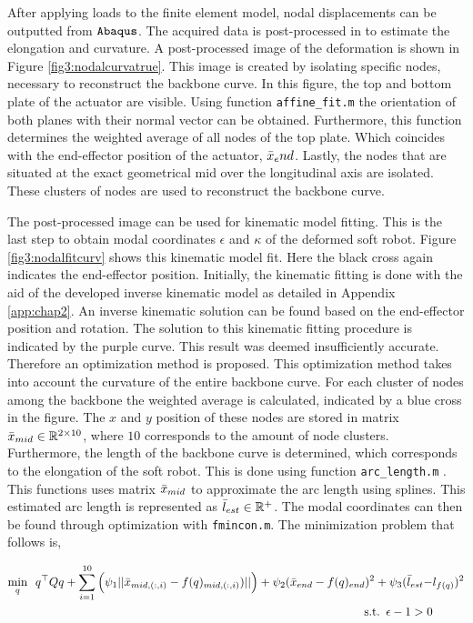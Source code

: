 After applying loads to the finite element model, nodal displacements can be outputted from $\verb+Abaqus+$. The acquired data is post-processed in \MATLAB to estimate the elongation and curvature. A post-processed image of the deformation is shown in Figure \ref{fig3:nodalcurvatrue}. This image is created by isolating specific nodes, necessary to reconstruct the backbone curve. In this figure, the top and bottom plate of the actuator are visible. Using \MATLAB function \verb+affine_fit.m+ \cite{affinefit} the orientation of both planes with their normal vector can be obtained. Furthermore, this function determines the weighted average of all nodes of the top plate. Which coincides with the end-effector position of the actuator, $\Bar{x}_end$. Lastly, the nodes that are situated at the exact geometrical mid over the longitudinal axis are isolated. These clusters of nodes are used to reconstruct the backbone curve. 


The post-processed image can be used for kinematic model fitting. This is the last step to obtain modal coordinates $\epsilon$ and $\kappa$ of the deformed soft robot. Figure \ref{fig3:nodalfitcurv} shows this kinematic model fit. Here the black cross again indicates the end-effector position. Initially, the kinematic fitting is done with the aid of the developed inverse kinematic model as detailed in Appendix \ref{app:chap2}. An inverse kinematic solution can be found based on the end-effector position and rotation. The solution to this kinematic fitting procedure is indicated by the purple curve. This result was deemed insufficiently accurate. Therefore an optimization method is proposed. This optimization method takes into account the curvature of the entire backbone curve. For each cluster of nodes among the backbone the weighted average is calculated, indicated by a blue cross in the figure. The $x$ and $y$ position of these nodes are stored in matrix $\Bar{x}_{mid} \in \mathbb{R}^{2\times 10}$, where $10$ corresponds to the amount of node clusters. Furthermore, the length of the backbone curve is determined, which corresponds to the elongation of the soft robot. This is done using \MATLAB function \verb+arc_length.m+ \cite{arclength}. This functions uses matrix $\Bar{x}_{mid}$ to approximate the arc length using splines. This estimated arc length is represented as $\Bar{l}_{est} \in \mathbb{R}^+$. The modal coordinates can then be found through optimization with \verb+fmincon.m+. The minimization problem that follows is,


\begin{equation}
\begin{aligned}
\min_{q} \hspace{5pt}  q^\top Q q  + \sum_{i=1}^{10}\Big(\psi_1 ||\Bar{x}_{mid,(:,i)} - f(q)_{mid,(:,i)})|| \Big) +   \psi_2(\Bar{x}_{end}  - f(q)_{end})^2 +  \psi_3(\Bar{l}_{est} - & l_{f(q)})^2  \\ 
\text{s.t.} \hspace{5pt} \epsilon - 1 > 0
\end{aligned}
\label{eq3:optim}
\end{equation}


